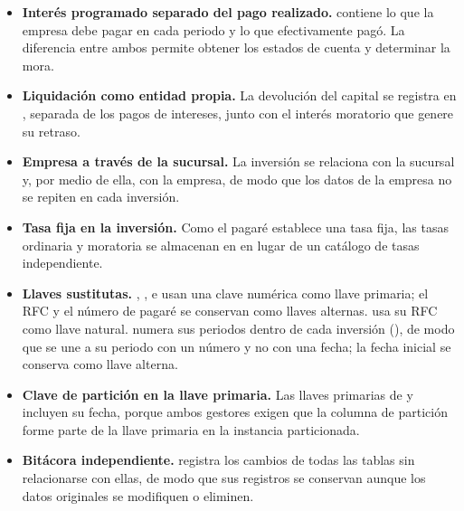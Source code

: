 \begin{itemize}[leftmargin=*]
	\item \textbf{Interés programado separado del pago realizado.}  contiene lo que la empresa debe pagar en cada periodo y  lo que efectivamente pagó. La diferencia entre ambos permite obtener los estados de cuenta y determinar la mora.
	\item \textbf{Liquidación como entidad propia.} La devolución del capital se registra en , separada de los pagos de intereses, junto con el interés moratorio que genere su retraso.
	\item \textbf{Empresa a través de la sucursal.} La inversión se relaciona con la sucursal y, por medio de ella, con la empresa, de modo que los datos de la empresa no se repiten en cada inversión.
	\item \textbf{Tasa fija en la inversión.} Como el pagaré establece una tasa fija, las tasas ordinaria y moratoria se almacenan en  en lugar de un catálogo de tasas independiente.
	\item \textbf{Llaves sustitutas.} , ,  e  usan una clave numérica como llave primaria; el RFC y el número de pagaré se conservan como llaves alternas.  usa su RFC como llave natural.  numera sus periodos dentro de cada inversi\'on (), de modo que  se une a su periodo con un n\'umero y no con una fecha; la fecha inicial se conserva como llave alterna.
	\item \textbf{Clave de partición en la llave primaria.} Las llaves primarias de  y  incluyen su fecha, porque ambos gestores exigen que la columna de partición forme parte de la llave primaria en la instancia particionada.
	\item \textbf{Bitácora independiente.}  registra los cambios de todas las tablas sin relacionarse con ellas, de modo que sus registros se conservan aunque los datos originales se modifiquen o eliminen.
\end{itemize}